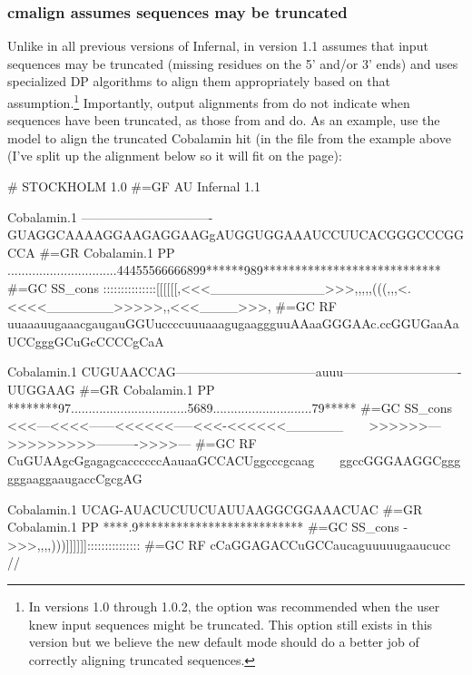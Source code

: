 \subsubsection{cmalign assumes sequences may be truncated}
Unlike in all previous versions of Infernal, in version 1.1
 assumes that input sequences may be truncated (missing
residues on the 5' and/or 3' ends) and uses specialized DP algorithms
to align them appropriately based on that assumption.\footnote{In
  versions 1.0 through 1.0.2, the   option
  was recommended when the user knew input sequences might be
  truncated. This option still exists in this version but we believe
  the new default mode should do a better job of correctly aligning
  truncated sequences.} Importantly, output alignments from
 do not indicate when sequences have been truncated, as
those from  and  do. As an example, use
the  model to align the truncated
Cobalamin hit (in the file  from the
 example above (I've split up the alignment below so it
will fit on the page):


\begin{sreoutput}
# STOCKHOLM 1.0
#=GF AU Infernal 1.1

Cobalamin.1         -------------------------------GUAGGCAAAAGGAAGAGGAAGgAUGGUGGAAAUCCUUCACGGGCCCGGCCA
#=GR Cobalamin.1 PP ...............................44455566666899******989****************************
#=GC SS_cons        :::::::::::::::[[[[[[,<<<____________>>>,,,,,(((,,,<.<<<<_______>>>>>,,<<<____>>>,
#=GC RF             uuaaauugaaacgaugauGGUuccccuuuaaagugaaggguuAAaaGGGAAc.ccGGUGaaAaUCCgggGCuGcCCCCgCaA

Cobalamin.1         CUGUAACCAG---------------------------------auuu----------------------------UUGGAAG
#=GR Cobalamin.1 PP ********97.................................5689............................79*****
#=GC SS_cons        <<<---<<<<------<<<<<<-----<<<-<<<<<<______~~~~>>>>>>--->>>>>>>>>---------->>>>---
#=GC RF             CuGUAAgcGgagagcaccccccAauaaGCCACUggcccgcaag~~~~ggccGGGAAGGCggggggaaggaaugaccCgcgAG

Cobalamin.1         UCAG-AUACUCUUCUAUUAAGGCGGAAACUAC
#=GR Cobalamin.1 PP ****.9**************************
#=GC SS_cons        ->>>,,,,)))]]]]]]:::::::::::::::
#=GC RF             cCaGGAGACCuGCCaucaguuuuugaaucucc
//
\end{sreoutput}

